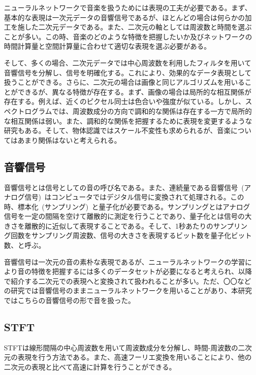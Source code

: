 
ニューラルネットワークで音楽を扱うためには表現の工夫が必要である。まず、基本的な表現は一次元データの音響信号であるが、ほとんどの場合は何らかの加工を施した二次元データである。また、二次元の軸としては周波数と時間を選ぶことが多い。この時、音楽のどのような特徴を把握したいか及びネットワークの時間計算量と空間計算量に合わせて適切な表現を選ぶ必要がある。

そして、多くの場合、二次元データでは中心周波数を利用したフィルタを用いて音響信号を分解し、信号を明確化する。これにより、効果的なデータ表現として扱うことができる。さらに、二次元の場合は画像と同じアルゴリズムを用いることができるが、異なる特徴が存在する。まず、画像の場合は局所的な相互関係が存在する。例えば、近くのピクセル同士は色合いや強度が似ている。しかし、スペクトログラムでは、周波数成分の方向で調和的な関係は存在する一方で局所的な相互関係は弱い。また、調和的な関係を把握するために表現を変更するような研究もある。そして、物体認識ではスケール不変性も求められるが、音楽についてはあまり関係はないと考えられる。

\subsection{音響信号}


音響信号とは信号としての音の呼び名である。また、連続量である音響信号~(アナログ信号)~はコンピュータではデジタル信号に変換されて処理される。この時、標本化~(サンプリング)~と量子化が必要である。サンプリングとはアナログ信号を一定の間隔を空けて離散的に測定を行うことであり、量子化とは信号の大きさを離散的に近似して表現することである。そして、1秒あたりのサンプリング回数をサンプリング周波数、信号の大きさを表現するビット数を量子化ビット数、と呼ぶ。

音響信号は一次元の音の素朴な表現であるが、ニューラルネットワークの学習により音の特徴を把握するには多くのデータセットが必要になると考えられ、以降で紹介する二次元での表現へと変換されて扱われることが多い。ただ、〇〇などの研究では音響信号のままニューラルネットワークを用いることがあり、本研究ではこちらの音響信号の形で音を扱った。

\subsection{STFT}

STFTは線形間隔の中心周波数を用いて周波数成分を分解し、時間-周波数の二次元の表現を行う方法である。また、高速フーリエ変換を用いることにより、他の二次元の表現と比べて高速に計算を行うことができる。

